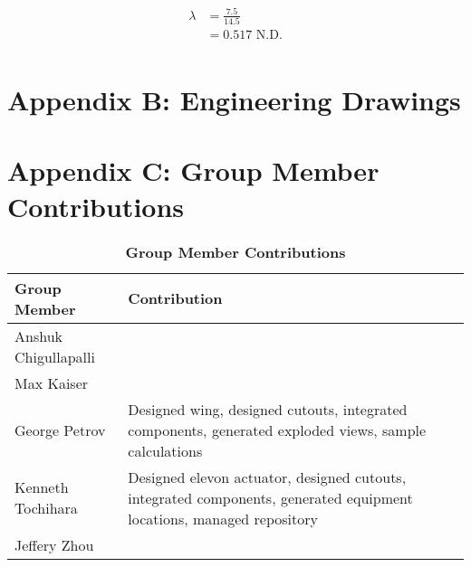 \begin{enumerate}[wide,label=\textbf{\arabic*}., labelindent=0pt]
        \begin{align*}
            \lambda &= \frac{7.5}{14.5}\\
            &= 0.517 \text{ N.D.}\\
        \end{align*}    
 
\section*{Appendix B: Engineering Drawings}\label{ApxB}





\section*{Appendix C: Group Member Contributions}

    \begin{table}[H]
        \begin{center} 
        \caption{\textbf{Group Member Contributions}}
        \begin{tabular}{ | p{2in} | p{4in}| } 
            \hline
            \textbf{Group Member} & \textbf{Contribution} \\  \hline
            Anshuk Chigullapalli & \\ \hline
            Max Kaiser & \\ \hline
            George Petrov & Designed wing, designed cutouts, integrated components, generated exploded views, sample calculations \\ \hline
            Kenneth Tochihara & Designed elevon actuator, designed cutouts, integrated components, generated equipment locations, managed repository \\ \hline
            Jeffery Zhou & \\ \hline
        \end{tabular}
        \end{center}
    \end{table}
    
\end{enumerate}